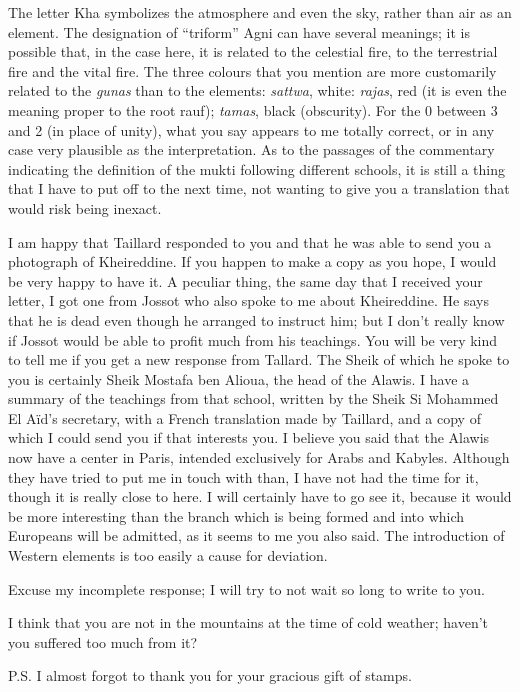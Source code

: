 The letter Kha symbolizes the atmosphere and even the sky, rather than air as an element. The designation of ``triform'' Agni can have several meanings; it is possible that, in the case here, it is related to the celestial fire, to the terrestrial fire and the vital fire. The three colours that you mention are more customarily related to the \emph{gunas} than to the elements: \emph{sattwa}, white: \emph{rajas}, red (it is even the meaning proper to the root rauf); \emph{tamas}, black (obscurity). For the 0 between 3 and 2 (in place of unity), what you say appears to me totally correct, or in any case very plausible as the interpretation. As to the passages of the commentary indicating the definition of the mukti following different schools, it is still a thing that I have to put off to the next time, not wanting to give you a translation that would risk being inexact.

I am happy that Taillard responded to you and that he was able to send you a photograph of Kheireddine. If you happen to make a copy as you hope, I would be very happy to have it. A peculiar thing, the same day that I received your letter, I got one from Jossot who also spoke to me about Kheireddine. He says that he is dead even though he arranged to instruct him; but I don't really know if Jossot would be able to profit much from his teachings. You will be very kind to tell me if you get a new response from Tallard. The Sheik of which he spoke to you is certainly Sheik Mostafa ben Alioua, the head of the Alawis. I have a summary of the teachings from that school, written by the Sheik Si Mohammed El Aïd's secretary, with a French translation made by Taillard, and a copy of which I could send you if that interests you. I believe you said that the Alawis now have a center in Paris, intended exclusively for Arabs and Kabyles. Although they have tried to put me in touch with than, I have not had the time for it, though it is really close to here. I will certainly have to go see it, because it would be more interesting than the branch which is being formed and into which Europeans will be admitted, as it seems to me you also said. The introduction of Western elements is too easily a cause for deviation.

Excuse my incomplete response; I will try to not wait so long to write to you.

I think that you are not in the mountains at the time of cold weather; haven't you suffered too much from it?

P.S. I almost forgot to thank you for your gracious gift of stamps.

